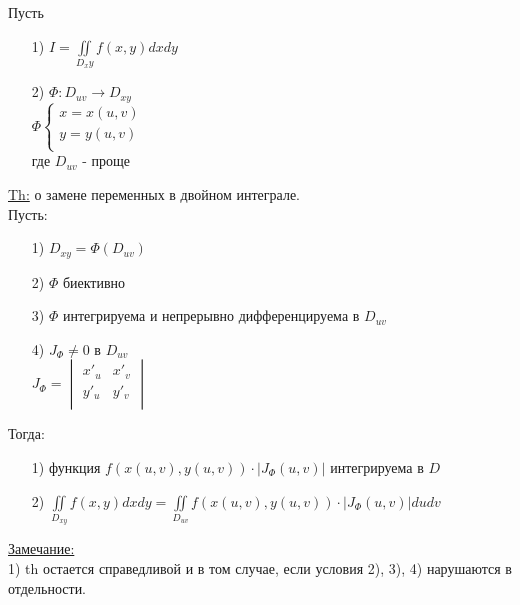 
Пусть \\
\begin{enumerate}
	\item[1)]
	$I = \iint\limits_{D_xy} f(x,y) dxdy$
	
	\item[2)] 
	$\Phi : D_{uv} \rightarrow D_{xy}$ \\
	$\Phi 	
	\begin{cases}
		x = x(u,v) \\
		y = y(u,v) \\
	\end{cases} $ \\
	
	где $D_{uv}$  -  проще
\end{enumerate}


\underline{Th:} о замене переменных в двойном интеграле. \\
Пусть: \\
\begin{enumerate}
	\item[1)] 
	$D_{xy} = \Phi (D_{uv})$ 
	
	\item[2)]
	$\Phi$ биективно
	
	\item[3)]
	$\Phi$ интегрируема и непрерывно дифференцируема в $D_{uv}$ 
	
	\item[4)]
	$J_{\Phi} \neq 0$ в $D_{uv}$ \\
	$J_{\Phi} = 
	\begin{vmatrix}
		x'_u & x'_v \\
		y'_u & y'_v \\
	\end{vmatrix} $
\end{enumerate}


Тогда:
\begin{enumerate}
	\item[1)] 
	функция $f \left( x\left(u,v\right), y\left(u,v\right) \right) \cdot \left| J_\Phi \left(u,v\right) \right|$ интегрируема в $D$ 
	
	\item[2)]
	$\iint\limits_{D_{xy}} f(x,y)dxdy = \iint\limits_{D_{uv}} f\left( x\left(u,v\right), y\left(u,v\right) \right)  \cdot \left| J_\Phi \left(u,v\right) \right| du dv$
\end{enumerate}

\underline{Замечание:} \\
1) th остается справедливой и в том случае, если условия 2), 3), 4) нарушаются в отдельности. \\

